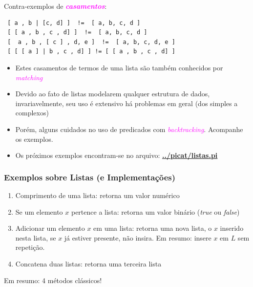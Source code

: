 \begin{frame}[fragile, allowframebreaks=0.9]
\begin{block}{Contra-exemplos de \textcolor{magenta}{{\em \textbf{casamentos}}}:}
\begin{verbatim}
 [ a , b | [c, d] ]  !=  [ a, b, c, d ]
 [ [ a , b , c , d] ]  !=  [ a, b, c, d ]
 [  a , b , [ c ] , d, e ]  !=  [ a, b, c, d, e ]
 [ [ [ a ] | b , c , d] ] != [ [ a , b , c , d] ]
 \end{verbatim}

\end{block}

\framebreak
\begin{itemize}
  \item Estes  casamentos de termos de uma lista
  são também conhecidos  por \textcolor{magenta}{{\em matching}} 

\item  Devido ao fato de listas modelarem
qualquer estrutura de dados, invariavelmente, seu uso  é extensivo
há  problemas em geral (dos simples a complexos)

\item Porém, alguns cuidados no uso de predicados com \textcolor{magenta}{\textit{backtracking}}.
 Acompanhe os exemplos.

\item Os próximos exemplos encontram-se no arquivo: \textcolor{red}{\textbf{\url{../picat/listas.pi}}}

\end{itemize}


\end{frame}

\begin{frame}[fragile]

\frametitle{Exemplos sobre Listas (e Implementações)}

\begin{enumerate}
  \item Comprimento de uma lista: retorna um valor numérico
  
  \pause
  \item Se um elemento $x$ pertence a lista: retorna um valor binário (\textit{true} ou \textit{false})


  \pause
  \item Adicionar um elemento $x$ em uma lista: retorna uma nova lista, o $x$ inserido nesta lista,
  se $x$ já estiver presente, não insira. Em resumo: insere $x$ em $L$ sem repetição.

  \pause
  \item Concatena duas listas: retorna uma terceira lista
  
\end{enumerate}

Em resumo: 4 métodos clássicos!

\end{frame}

